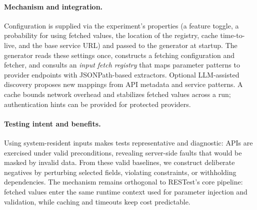 \documentclass[conference]{IEEEtran}
\begin{document}
\paragraph{Mechanism and integration.}
Configuration is supplied via the experiment’s properties (a feature toggle, a probability for using fetched values, the location of the registry, cache time-to-live, and the base service URL) and passed to the generator at startup. The generator reads these settings once, constructs a fetching configuration and fetcher, and consults an \emph{input fetch registry} that maps parameter patterns to provider endpoints with JSONPath-based extractors. Optional LLM-assisted discovery proposes new mappings from API metadata and service patterns. A cache bounds network overhead and stabilizes fetched values across a run; authentication hints can be provided for protected providers.


\paragraph{Testing intent and benefits.}
Using system-resident inputs makes tests representative and diagnostic: APIs are exercised under valid preconditions, revealing server-side faults that would be masked by invalid data. From these valid baselines, we construct deliberate negatives by perturbing selected fields, violating constraints, or withholding dependencies. The mechanism remains orthogonal to RESTest’s core pipeline: fetched values enter the same runtime context used for parameter injection and validation, while caching and timeouts keep cost predictable.
\end{document}
